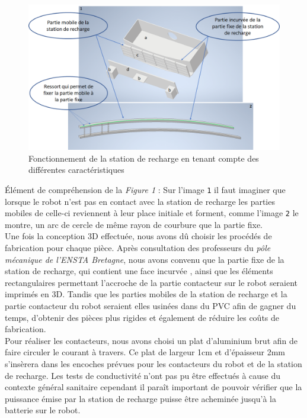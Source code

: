\documentclass[french]{rapportENSTAB}
\begin{document}
\begin{figure}[H]
    \centering
    \includegraphics[scale=0.6]{images/station de recharge/fonctionnement station de rehcrage.png}
    \caption{Fonctionnement de la station de recharge en tenant compte des différentes caractéristiques}
    \label{fig:station de recharge}
\end{figure}
Élément de compréhension de la \textit{Figure 1} : Sur l’image \texttt{1} il faut imaginer que lorsque le robot n’est pas en contact avec la station de recharge les parties mobiles de celle-ci reviennent à leur place initiale et forment, comme l’image \texttt{2} le montre, un arc de cercle de même rayon de courbure que la partie fixe.\\

Une fois la conception 3D effectuée, nous avons dû choisir les procédés de fabrication pour chaque pièce. Après consultation des professeurs du \textit{pôle mécanique de l'ENSTA Bretagne}, nous avons convenu que la partie fixe de la station de recharge, qui contient une face incurvée , ainsi que les éléments rectangulaires permettant l'accroche de la partie contacteur sur le robot   seraient imprimés en 3D. Tandis que les parties mobiles de la station de recharge  et la partie contacteur du robot  seraient elles usinées dans du PVC afin de gagner du temps, d'obtenir des pièces plus rigides et également de réduire les coûts de fabrication. \\

Pour réaliser les contacteurs, nous avons choisi un plat d'aluminium brut afin de faire circuler le courant à travers. Ce plat de largeur 1cm et d'épaisseur 2mm s'insèrera dans les encoches prévues pour les contacteurs du robot et de la station de recharge. Les tests de conductivité n'ont pas pu être effectués à cause du contexte général sanitaire cependant il paraît important de pouvoir vérifier que la puissance émise par la station de recharge puisse être acheminée jusqu'à la batterie sur le robot. \\
\end{document}
